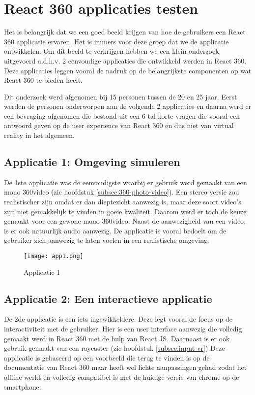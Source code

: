 \chapter{React 360 applicaties testen}
\label{ch:react-360-apps}
Het is belangrijk dat we een goed beeld krijgen van hoe de gebruikers een React 360 applicatie ervaren. Het is immers voor deze groep dat we de applicatie ontwikkelen. Om dit beeld te verkrijgen hebben we een klein onderzoek uitgevoerd a.d.h.v. 2 eenvoudige applicaties die ontwikkeld werden in React 360. Deze applicaties leggen vooral de nadruk op de belangrijkste componenten op wat React 360 te bieden heeft. 

Dit onderzoek werd afgenomen bij 15 personen tussen de 20 en 25 jaar. Eerst werden de personen onderworpen aan de volgende 2 applicaties en daarna werd er een bevraging afgenomen die bestond uit een 6-tal korte vragen die vooral een antwoord geven op de user experience van React 360 en dus niet van virtual reality in het algemeen.

\section{Applicatie 1: Omgeving simuleren}
\label{sec:omgeving-simulatie}
De 1ste applicatie was de eenvoudigste waarbij er gebruik werd gemaakt van een mono 360\textdegree video (zie hoofdstuk \ref{subsec:360-photo-video}). Een stereo versie zou realistischer zijn omdat er dan dieptezicht aanwezig is, maar deze soort video's zijn niet gemakkelijk te vinden in goeie kwaliteit. Daarom werd er toch de keuze gemaakt voor een gewone mono 360\textdegree video. Naast de aanwezigheid van een video, is er ook natuurlijk audio aanwezig. De applicatie is vooral bedoelt om de gebruiker zich aanwezig te laten voelen in een realistische omgeving.

\begin{figure}[H]
	\centering
	\texttt{[image: app1.png]}
	\caption{Applicatie 1}
	\label{fig:app1}
\end{figure}

\section{Applicatie 2: Een interactieve applicatie}
\label{sec:interactieve-applicatie}
De 2de applicatie is een iets ingewikkeldere. Deze legt vooral de focus op de interactiviteit met de gebruiker. Hier is een user interface aanwezig die volledig gemaakt werd in React 360 met de hulp van React JS. Daarnaast is er ook gebruik gemaakt van een raycaster (zie hoofdstuk \ref{subsec:input-vr}) Deze applicatie is gebaseerd op een voorbeeld die terug te vinden is op de documentatie van React 360 maar heeft wel lichte aanpassingen gehad zodat het offline werkt en volledig compatibel is met de huidige versie van chrome op de smartphone.

